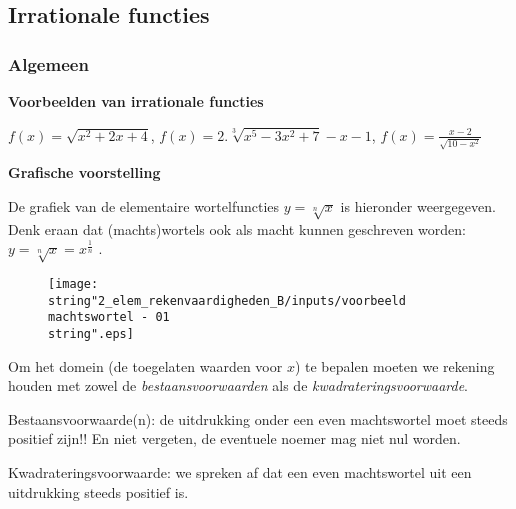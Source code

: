 \subsection{Irrationale functies}


\subsubsection{Algemeen}

\noindent \textbf{Voorbeelden van irrationale functies}

\noindent ${\displaystyle f(x)=\sqrt{x^{2}+2x+4}}$, ${\displaystyle f(x)=2.\sqrt[3]{x^{5}-3x^{2}+7}-x-1}$,
${\displaystyle f(x)=\frac{x-2}{\sqrt{10-x^{2}}}}$

\noindent \textbf{Grafische voorstelling}

De grafiek van de elementaire wortelfuncties ${\displaystyle y=\sqrt[n]{x}}$
is hieronder weergegeven. Denk eraan dat (machts)wortels ook als macht
kunnen geschreven worden: ${\displaystyle y=\sqrt[n]{x}}=x^{\frac{1}{n}}$
.

\begin{figure}[h]
\centering
\texttt{[image: \\string"2\_elem\_rekenvaardigheden\_B/inputs/voorbeeld machtswortel - 01\\string".eps]}
\end{figure}
\medskip{}


Om het domein (de toegelaten waarden voor $x$) te bepalen moeten
we rekening houden met zowel de \emph{bestaansvoorwaarden} als de
\emph{kwadrateringsvoorwaarde}.

Bestaansvoorwaarde(n): de uitdrukking onder een even machtswortel
moet steeds positief zijn!! En niet vergeten, de eventuele noemer
mag niet nul worden.

Kwadrateringsvoorwaarde: we spreken af dat een even machtswortel uit
een uitdrukking steeds positief is.


